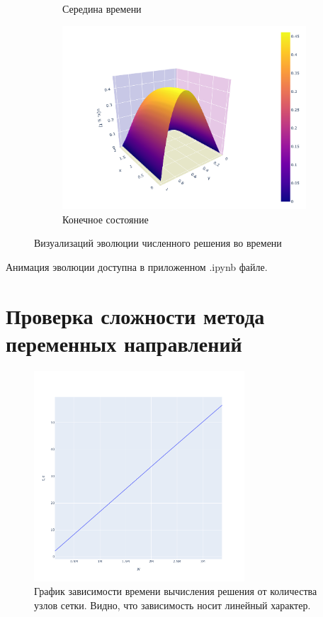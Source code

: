 \documentclass[a4paper]{article}
\begin{document}
\begin{figure}[H]
\begin{subfigure}{0.4\textwidth}
 \caption{Середина времени}
\end{subfigure}
\begin{subfigure}{0.4\textwidth}
 \includegraphics[width=\textwidth,keepaspectratio=true]{end.pdf}
 
 \caption{Конечное состояние}
\end{subfigure}
\caption{Визуализаций эволюции численного решения во времени}
\end{figure}

Анимация эволюции доступна в приложенном .ipynb файле.

\section{Проверка сложности метода переменных направлений}
\begin{figure}[H]
\begin{center}
 \includegraphics[width=0.7\textwidth,keepaspectratio=true]{performance.pdf}
 
 \caption{График зависимости времени вычисления решения от количества узлов сетки. Видно, что зависимость носит линейный характер.}
\end{center}
\end{figure} 
\end{document}
